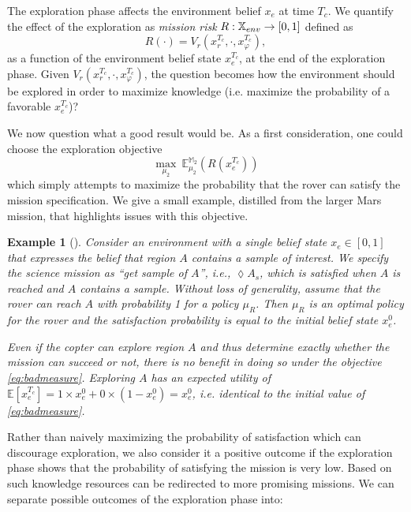 \documentclass[conference]{IEEEtran}
\newtheorem{example}{Example}
\begin{document}

The exploration phase affects the environment belief $x_e$ at time $T_c$. We quantify the effect of the exploration as \emph{mission risk} $R:\mathbb{X}_{env}\rightarrow [0,1]$ defined as
\begin{equation}
	R(\cdot) = V_r(x^{T_c}_r, \cdot, x^{T_c}_\varphi),
\end{equation}
as a function of the environment belief state $x_e^{T_c}$, at the end of the exploration phase. Given $V_r(x^{T_c}_r, \cdot, x^{T_c}_\varphi)$, the question becomes how the environment should be explored in order to maximize knowledge (i.e. maximize the probability of a favorable $x_{e}^{T_c}$)?

We now question what a good result would be. As a first consideration, one could choose the exploration objective
\begin{equation}
\label{eq:badmeasure}
	\max_{\mu_{2}}\  \mathbb E^{\mathbb M_{2}}_{\mu_2} (R(x^{T_c}_e) )
\end{equation}
which simply attempts to maximize the probability that the rover can satisfy the mission specification. We give a small example, distilled from the larger Mars mission, that highlights issues with this objective.

\begin{example}[]
	Consider an environment with a single belief state $x_e\in[0,1]$ that expresses the belief that region $A$ contains a sample of interest.
	We specify the science mission as ``\emph{get  sample of $A$}'', i.e.,  $\lozenge A_s$, which is satisfied when $A$ is reached and $A$ contains a sample.
	Without loss of generality, assume that the rover can reach $A$ with probability 1 for a policy $\mu_R$. Then $\mu_R$ is an optimal policy for the rover and the satisfaction probability is equal to the initial belief state $x_e^{0}$.
  
  Even if the copter can explore region $A$ and thus determine exactly whether the mission can succeed or not, there is no benefit in doing so under the objective \eqref{eq:badmeasure}. Exploring $A$ has an expected utility of $\mathbb{E} \left[ x^{T_c}_e \right] = 1\times x_e^{0} +  0\times (1- x_e^{0}) = x_e^0$, i.e. identical to the initial value of \eqref{eq:badmeasure}. 
\end{example}
 
Rather than naively maximizing the probability of satisfaction which can discourage exploration, we also consider it a positive outcome if the exploration phase shows that the probability of satisfying the mission is very low. Based on such knowledge resources can be redirected to more promising missions. We can separate possible outcomes of the exploration phase into:
\end{document}
